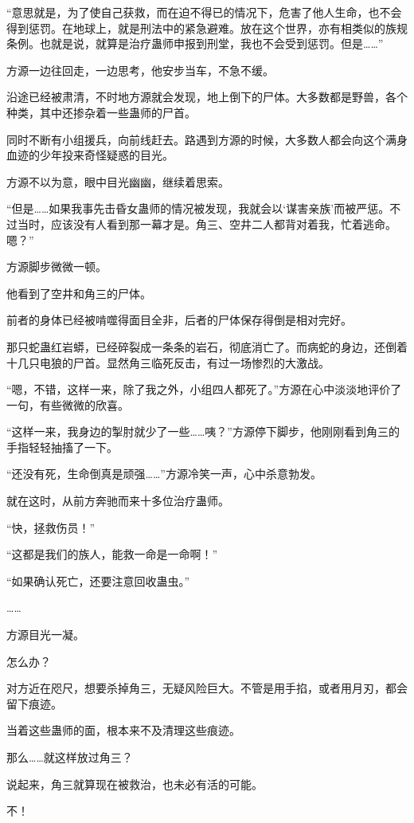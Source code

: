 \begin{this_body}
“意思就是，为了使自己获救，而在迫不得已的情况下，危害了他人生命，也不会得到惩罚。在地球上，就是刑法中的紧急避难。放在这个世界，亦有相类似的族规条例。也就是说，就算是治疗蛊师申报到刑堂，我也不会受到惩罚。但是……”

方源一边往回走，一边思考，他安步当车，不急不缓。

沿途已经被肃清，不时地方源就会发现，地上倒下的尸体。大多数都是野兽，各个种类，其中还掺杂着一些蛊师的尸首。

同时不断有小组援兵，向前线赶去。路遇到方源的时候，大多数人都会向这个满身血迹的少年投来奇怪疑惑的目光。

方源不以为意，眼中目光幽幽，继续着思索。

“但是……如果我事先击昏女蛊师的情况被发现，我就会以‘谋害亲族’而被严惩。不过当时，应该没有人看到那一幕才是。角三、空井二人都背对着我，忙着逃命。嗯？”

方源脚步微微一顿。

他看到了空井和角三的尸体。

前者的身体已经被啃噬得面目全非，后者的尸体保存得倒是相对完好。

那只蛇蛊红岩蟒，已经碎裂成一条条的岩石，彻底消亡了。而病蛇的身边，还倒着十几只电狼的尸首。显然角三临死反击，有过一场惨烈的大激战。

“嗯，不错，这样一来，除了我之外，小组四人都死了。”方源在心中淡淡地评价了一句，有些微微的欣喜。

“这样一来，我身边的掣肘就少了一些……咦？”方源停下脚步，他刚刚看到角三的手指轻轻抽搐了一下。

“还没有死，生命倒真是顽强……”方源冷笑一声，心中杀意勃发。

就在这时，从前方奔驰而来十多位治疗蛊师。

“快，拯救伤员！”

“这都是我们的族人，能救一命是一命啊！”

“如果确认死亡，还要注意回收蛊虫。”

……

方源目光一凝。

怎么办？

对方近在咫尺，想要杀掉角三，无疑风险巨大。不管是用手掐，或者用月刃，都会留下痕迹。

当着这些蛊师的面，根本来不及清理这些痕迹。

那么……就这样放过角三？

说起来，角三就算现在被救治，也未必有活的可能。

不！


\end{this_body}
